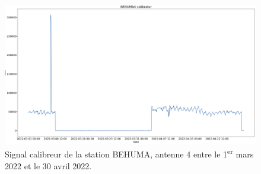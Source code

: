 \documentclass[11pt]{article}
\begin{document}
\begin{figure}[t]
    \begin{center}
        \includegraphics[scale=0.17]{BEHUMA4_2022-03-01_2022-04-30_calibrator.png}
        \caption{Signal calibreur de la station BEHUMA, antenne 4 entre le 1\textsuperscript{er} mars 2022 et le 30 avril 2022.}
        \label{fig:BEHUMA1-anomalie}
    \end{center}
\end{figure}
\end{document}
